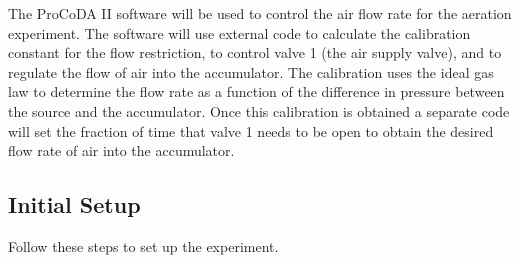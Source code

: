 \documentclass[letterpaper,10pt,english]{sphinxmanual}
\begin{document}
The ProCoDA II software will be used to control the air flow rate for the aeration experiment. The software will use external code to calculate the calibration constant for the flow restriction, to control valve 1 (the air supply valve), and to regulate the flow of air into the accumulator. The calibration uses the ideal gas law to determine the flow rate as a function of the difference in pressure between the source and the accumulator. Once this calibration is obtained a separate code will set the fraction of time that valve 1 needs to be open to obtain the desired flow rate of air into the accumulator.


\subsection{Initial Setup}
\label{\detokenize{Gas_Transfer/Gas_Transfer:initial-setup}}
Follow these steps to set up the experiment.
\end{document}
